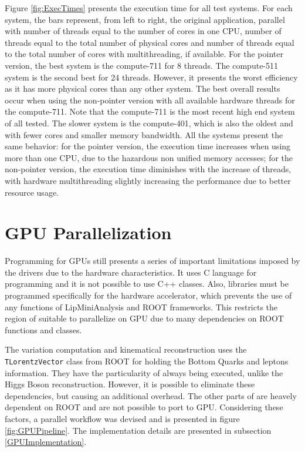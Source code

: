 Figure \ref{fig:ExecTimes} presents the execution time for all test systems. For each system, the bars represent, from left to right, the original application, parallel with number of threads equal to the number of cores in one CPU, number of threads equal to the total number of physical cores and number of threads equal to the total number of cores with multithreading, if available. For the pointer version, the best system is the compute-711 for 8 threads. The compute-511 system is the second best for 24 threads. However, it presents the worst efficiency as it has more physical cores than any other system. The best overall results occur when using the non-pointer version with all available hardware threads for the compute-711. Note that the compute-711 is the most recent high end system of all tested. The slower system is the compute-401, which is also the oldest and with fewer cores and smaller memory bandwidth. All the systems present the same behavior: for the pointer version, the execution time increases when using more than one CPU, due to the hazardous non unified memory accesses; for the non-pointer version, the execution time diminishes with the increase of threads, with hardware multithreading slightly increasing the performance due to better resource usage.

\section{GPU Parallelization}
\label{Parallelization:GPU}

Programming for GPUs still presents a series of important limitations imposed by the drivers due to the hardware characteristics. It uses C language for programming and it is not possible to use C++ classes. Also, libraries must be programmed specifically for the hardware accelerator, which prevents the use of any functions of LipMiniAnalysis and ROOT frameworks. This restricts the region of \ttDilepKinFit suitable to parallelize on GPU due to many dependencies on ROOT functions and classes.

The variation computation and kinematical reconstruction uses the \texttt{TLorentzVector} class from ROOT for holding the Bottom Quarks and leptons information. They have the particularity of always being executed, unlike the Higgs Boson reconstruction. However, it is possible to eliminate these dependencies, but causing an additional overhead. The other parts of \ttDilepKinFit are heavely dependent on ROOT and are not possible to port to GPU. Considering these factors, a parallel workflow was devised and is presented in figure \ref{fig:GPUPipeline}. The implementation details are presented in subsection \ref{GPUImplementation}. 

